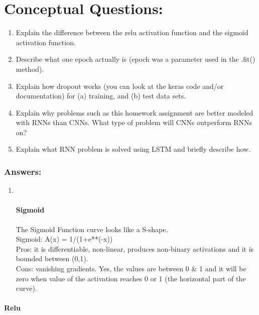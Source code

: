 \documentclass[11pt]{article}
\begin{document}
    \hypertarget{conceptual-questions}{%
\section{Conceptual Questions:}\label{conceptual-questions}}

\begin{enumerate}
\def\labelenumi{\arabic{enumi})}
\setcounter{enumi}{4}
\item
  Explain the difference between the relu activation function and the
  sigmoid activation function.
\item
  Describe what one epoch actually is (epoch was a parameter used in the
  .fit() method).
\item
  Explain how dropout works (you can look at the keras code and/or
  documentation) for (a) training, and (b) test data sets.
\item
  Explain why problems such as this homework assignment are better
  modeled with RNNs than CNNs. What type of problem will CNNs outperform
  RNNs on?
\item
  Explain what RNN problem is solved using LSTM and briefly describe
  how.
\end{enumerate}

    \hypertarget{answers}{%
\subsubsection{Answers:}\label{answers}}

    \begin{enumerate}
\def\labelenumi{\arabic{enumi})}
\setcounter{enumi}{4}
\item ~
  \hypertarget{sigmoid}{%
  \paragraph{Sigmoid}\label{sigmoid}}

  The Sigmoid Function curve looks like a S-shape.\\
  Sigmoid: A(x) = 1/(1+e**(-x))\\
  Pros: it is differentiable, non-linear, produces non-binary
  activations and it is bounded between (0,1).\\
  Cons: vanishing gradients. Yes, the values are between 0 \& 1 and it
  will be zero when value of the activation reaches 0 or 1 (the
  horizontal part of the curve).
\end{enumerate}

\hypertarget{relu}{%
\paragraph{Relu}\label{relu}}
\end{document}
